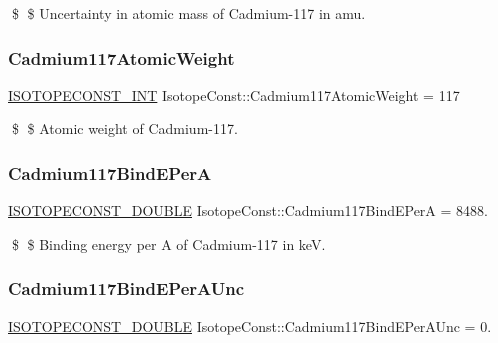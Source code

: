 \$ \$ Uncertainty in atomic mass of Cadmium-\/117 in amu. \mbox{\label{group___isotope_const-_cadmium-_cd117_ga1c1132eb5637943a89a3b95ea3f2f3c6}} 
\subsubsection{\texorpdfstring{Cadmium117\+Atomic\+Weight}{Cadmium117AtomicWeight}}
{\footnotesize\ttfamily \mbox{\hyperlink{group___isotope_const-_macros_ga5f18360b3e99483a35c32d789e62621c}{I\+S\+O\+T\+O\+P\+E\+C\+O\+N\+S\+T\+\_\+\+I\+NT}} Isotope\+Const\+::\+Cadmium117\+Atomic\+Weight = 117}

\$ \$ Atomic weight of Cadmium-\/117. \mbox{\label{group___isotope_const-_cadmium-_cd117_ga6793133c93e328a6b65abef053a9afef}} 
\subsubsection{\texorpdfstring{Cadmium117\+Bind\+E\+PerA}{Cadmium117BindEPerA}}
{\footnotesize\ttfamily \mbox{\hyperlink{group___isotope_const-_macros_ga8f45a7272ce02c0b4c65c44636ed719a}{I\+S\+O\+T\+O\+P\+E\+C\+O\+N\+S\+T\+\_\+\+D\+O\+U\+B\+LE}} Isotope\+Const\+::\+Cadmium117\+Bind\+E\+PerA = 8488.}

\$ \$ Binding energy per A of Cadmium-\/117 in keV. \mbox{\label{group___isotope_const-_cadmium-_cd117_gad9c1af4f64dda674c9cbf046f2b2757a}} 
\subsubsection{\texorpdfstring{Cadmium117\+Bind\+E\+Per\+A\+Unc}{Cadmium117BindEPerAUnc}}
{\footnotesize\ttfamily \mbox{\hyperlink{group___isotope_const-_macros_ga8f45a7272ce02c0b4c65c44636ed719a}{I\+S\+O\+T\+O\+P\+E\+C\+O\+N\+S\+T\+\_\+\+D\+O\+U\+B\+LE}} Isotope\+Const\+::\+Cadmium117\+Bind\+E\+Per\+A\+Unc = 0.}

